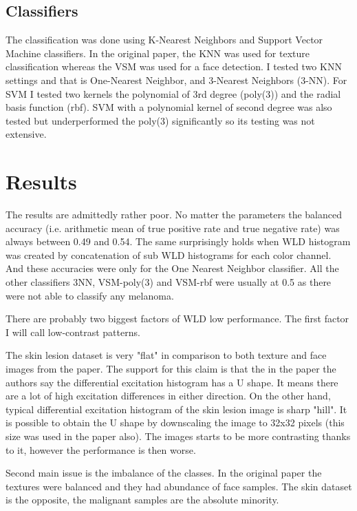 \documentclass[a4paper,10pt,twocolumn]{article}
\begin{document}
\subsection{Classifiers}

The classification was done using K-Nearest Neighbors and Support Vector Machine classifiers.
In the original paper, the KNN was used for texture classification whereas the VSM was used for a face detection.
I tested two KNN settings and that is One-Nearest Neighbor, and 3-Nearest Neighbors (3-NN).
For SVM I tested two kernels the polynomial of 3rd degree (poly(3)) and the radial basis function (rbf).
SVM with a polynomial kernel of second degree was also tested but underperformed the poly(3) significantly so its testing was not extensive.

\section{Results}

The results are admittedly rather poor.
No matter the parameters the balanced accuracy (i.e. arithmetic mean of true positive rate and true negative rate) was always between 0.49 and 0.54.
The same surprisingly holds when WLD histogram was created by concatenation of sub WLD histograms for each color channel.
And these accuracies were only for the One Nearest Neighbor classifier.
All the other classifiers 3NN, VSM-poly(3) and VSM-rbf were usually at 0.5 as there were not able to classify any melanoma.

There are probably two biggest factors of WLD low performance.
The first factor I will call low-contrast patterns.

The skin lesion dataset is very "flat" in comparison to both texture and face images from the paper.
The support for this claim is that the in the paper the authors say the differential excitation histogram has a U shape.
It means there are a lot of high excitation differences in either direction.
On the other hand, typical differential excitation histogram of the skin lesion image is sharp "hill".
It is possible to obtain the U shape by downscaling the image to 32x32 pixels (this size was used in the paper also).
The images starts to be more contrasting thanks to it, however the performance is then worse.

Second main issue is the imbalance of the classes.
In the original paper the textures were balanced and they had abundance of face samples.
The skin dataset is the opposite, the malignant samples are the absolute minority.
\end{document}
